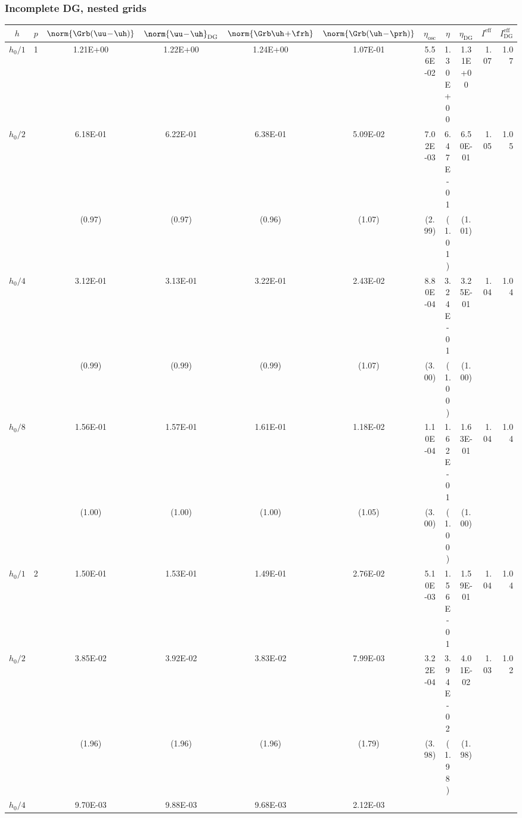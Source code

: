 \documentclass[compress]{beamer}
\begin{document}
\begin{frame}[shrink=10]
\frametitle{Incomplete DG, nested grids}

\vspace{-0.1cm}

{\tiny                   %
\begin{tabular}{|cc|cc|ccc|cc|rr|}
 \hline
  $h$ &  \alert{$p$}
 & $\norm{\Grb(\uu \! - \! \uh)}$
 & $\norm{\uu \! - \! \uh}_{\mathrm{DG}}$
 & $\norm{\Grb \uh \! + \! \frh}$
 & $\norm{\Grb (\uh \! - \! \prh)}$
 & $\eta_{\mathrm{osc}}$
 & $\eta$
 & $\eta_{\mathrm{DG}}$
 & \alert{$I^{\mathrm{eff}}$}
 & $I^{\mathrm{eff}}_{\mathrm {DG}}$
 \\[-0.01cm]   \hline
$h_0/1$
 &   \alert{1}
 &   1.21E+00
 &  1.22E+00
 &   1.24E+00
 &   1.07E-01
 &   5.56E-02
 &   1.30E+00
 &   1.31E+00
 &     \alert{1.07}
 &     1.07
\\[-0.01cm]
$h_0/2$
 &
 &   6.18E-01
 &   6.22E-01
 &   6.38E-01
 &   5.09E-02
 &   7.02E-03
 &   6.47E-01
 &   6.50E-01
 &     \alert{1.05}
 &     1.05
\\[-0.01cm]
   \multicolumn{2}{|c|}{{}}
 & (0.97)
 & (0.97)
 & (0.96)
 & (1.07)
 & (2.99)
 & (1.01)
 & (1.01)
  &
  &
\\[-0.01cm]
$h_0/4$
 &
 &   3.12E-01
 &   3.13E-01
 &   3.22E-01
 &   2.43E-02
 &   8.80E-04
 &   3.24E-01
 &   3.25E-01
 &     \alert{1.04}
 &     1.04
\\[-0.01cm]
   \multicolumn{2}{|c|}{{}}
 & (0.99)
 & (0.99)
 & (0.99)
 & (1.07)
 & (3.00)
 & (1.00)
 & (1.00)
  &
  &
\\[-0.01cm]
$h_0/8$
 &
 &   1.56E-01
 &   1.57E-01
 &   1.61E-01
 &   1.18E-02
 &   1.10E-04
 &   1.62E-01
 &   1.63E-01
 &     \alert{1.04}
 &     1.04
\\[-0.01cm]
   \multicolumn{2}{|c|}{{}}
 & (1.00)
 & (1.00)
 & (1.00)
 & (1.05)
 & (3.00)
 & (1.00)
 & (1.00)
  &
  &
\\[-0.01cm]
 \hline
$h_0/1$
 &   \alert{2}
 &   1.50E-01
 &   1.53E-01
 &   1.49E-01
 &   2.76E-02
 &   5.10E-03
 &   1.56E-01
 &   1.59E-01
 &     \alert{1.04}
 &     1.04
\\[-0.01cm]
$h_0/2$
 &
 &   3.85E-02
 &   3.92E-02
 &   3.83E-02
 &   7.99E-03
 &   3.22E-04
 &   3.94E-02
 &   4.01E-02
 &     \alert{1.03}
 &     1.02
\\[-0.01cm]
   \multicolumn{2}{|c|}{{}}
 & (1.96)
 & (1.96)
 & (1.96)
 & (1.79)
 & (3.98)
 & (1.98)
 & (1.98)
  &
  &
\\[-0.01cm]
$h_0/4$
 &
 &   9.70E-03
 &   9.88E-03
 &   9.68E-03
 &   2.12E-03

\end{tabular}}
\end{frame}
\end{document}

